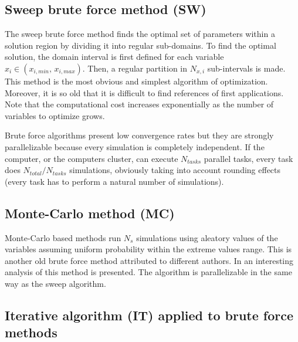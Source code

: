 \documentclass[review,authoryear]{elsarticle}
\newcommand{\PA}[1]{\left(#1\right)}
\begin{document}
\subsection{Sweep brute force method (SW)}

The sweep brute force method finds the optimal set of parameters within a solution region by dividing it into regular sub-domains. To find the optimal solution, the domain interval is first defined for each variable $x_i \in \PA{x_{i,min},\,x_{i,max}}$. Then, a regular partition in  $N_{x,i}$ sub-intervals is made. This method is the most obvious and simplest algorithm of optimization. Moreover, it is so old that it is difficult to find references of first applications. Note that the computational cost increases exponentially as the number of variables to optimize grows.

Brute force algorithms present low convergence rates but they are strongly
parallelizable because every simulation is completely independent. If the
computer, or the computers cluster, can execute $N_{tasks}$ parallel tasks,
every task does $N_{total}/N_{tasks}$ simulations, obviously taking into account
rounding effects (every task has to perform a natural number of simulations).

\subsection{Monte-Carlo method (MC)}

Monte-Carlo based methods run $N_s$ simulations using aleatory values of the
variables assuming uniform probability within the extreme values range. This is
another old brute force method attributed to different authors. In
\citet{AtanassovDimov08} an interesting analysis of this method is presented.
The algorithm is parallelizable in the same way as the sweep algorithm.

\subsection{Iterative algorithm (IT) applied to brute force methods}
\end{document}
